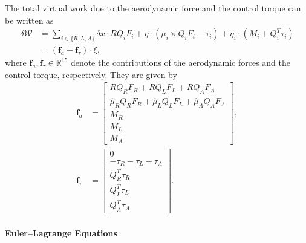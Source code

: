 \documentclass[10pt]{article}
\renewcommand{\Re}{\ensuremath{\mathbb{R}}}
\begin{document}
The total virtual work due to the aerodynamic force and the control torque can be written as
\begin{align}
    \delta\mathcal{W} & = \sum_{i\in\{R,L,A\}} \delta x \cdot R Q_i F_i + \eta\cdot (\mu_i\times Q_i F_i -\tau_i) + \eta_i \cdot ( M_i+ Q_i^T \tau_i) \nonumber \\
                      & = (\mathbf{f}_{a} + \mathbf{f}_\tau)  \cdot \xi,
\end{align}
where $\mathbf{f}_a, \mathbf{f}_\tau \in\Re^{15}$ denote the contributions of the aerodynamic forces and the control torque, respectively. 
They are given by
\begin{align}
    \mathbf{f}_a & = 
    \begin{bmatrix}
        RQ_R F_R  + R Q_L F_L + R Q_A F_A \\
        \hat \mu_R Q_RF_R + \hat\mu_L Q_L F_L + \hat\mu_A Q_A F_A \\
        M_R  \\
        M_L  \\
        M_A   
    \end{bmatrix},\\
    \mathbf{f}_\tau & = 
    \begin{bmatrix}
        0 \\
         -\tau_R  -\tau_L  -\tau_A \\
        Q_R^T \tau_R \\
        Q_L^T \tau_L \\
        Q_A^T \tau_A
    \end{bmatrix}.\label{eqn:f_tau}
\end{align}

\paragraph{Euler--Lagrange Equations}
\end{document}
